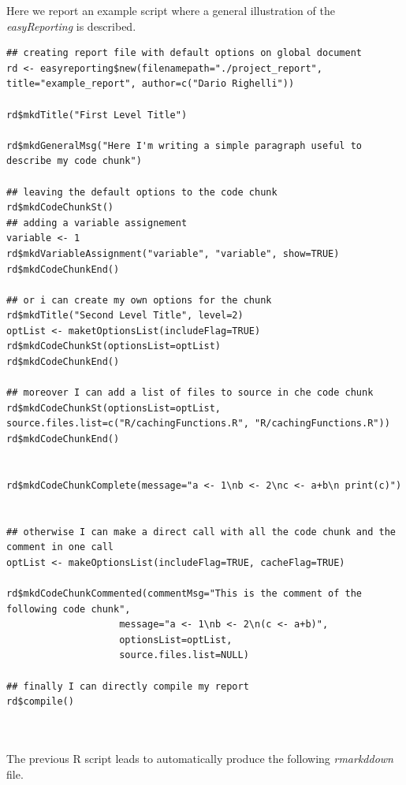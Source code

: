 Here we report an example script where a general illustration of the \textit{easyReporting} is described.

\begin{lstlisting}
## creating report file with default options on global document
rd <- easyreporting$new(filenamepath="./project_report", title="example_report", author=c("Dario Righelli"))

rd$mkdTitle("First Level Title")

rd$mkdGeneralMsg("Here I'm writing a simple paragraph useful to describe my code chunk")

## leaving the default options to the code chunk
rd$mkdCodeChunkSt()
## adding a variable assignement
variable <- 1
rd$mkdVariableAssignment("variable", "variable", show=TRUE)
rd$mkdCodeChunkEnd()

## or i can create my own options for the chunk
rd$mkdTitle("Second Level Title", level=2)
optList <- maketOptionsList(includeFlag=TRUE)
rd$mkdCodeChunkSt(optionsList=optList)
rd$mkdCodeChunkEnd()

## moreover I can add a list of files to source in che code chunk
rd$mkdCodeChunkSt(optionsList=optList, source.files.list=c("R/cachingFunctions.R", "R/cachingFunctions.R"))
rd$mkdCodeChunkEnd()


rd$mkdCodeChunkComplete(message="a <- 1\nb <- 2\nc <- a+b\n print(c)")


## otherwise I can make a direct call with all the code chunk and the comment in one call
optList <- makeOptionsList(includeFlag=TRUE, cacheFlag=TRUE)

rd$mkdCodeChunkCommented(commentMsg="This is the comment of the following code chunk",
                    message="a <- 1\nb <- 2\n(c <- a+b)",
                    optionsList=optList,
                    source.files.list=NULL)

## finally I can directly compile my report
rd$compile()



\end{lstlisting}
 
 
 
The previous R script leads to automatically produce the following \textit{rmarkddown} file.


